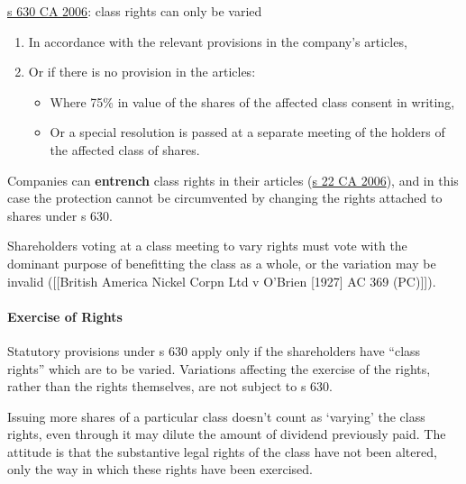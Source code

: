 \documentclass[
]{article}
\providecommand{\tightlist}{%
  \setlength{\itemsep}{0pt}\setlength{\parskip}{0pt}}
\begin{document}
\href{https://www.legislation.gov.uk/ukpga/2006/46/section/630}{s 630 CA
2006}: class rights can only be varied

\begin{enumerate}
\def\labelenumi{\arabic{enumi}.}
\tightlist
\item
  In accordance with the relevant provisions in the company's articles,
\item
  Or if there is no provision in the articles:

  \begin{itemize}
  \tightlist
  \item
    Where 75\% in value of the shares of the affected class consent in
    writing,
  \item
    Or a special resolution is passed at a separate meeting of the
    holders of the affected class of shares.
  \end{itemize}
\end{enumerate}

Companies can \textbf{entrench} class rights in their articles
(\href{https://www.legislation.gov.uk/ukpga/2006/46/section/22}{s 22 CA
2006}), and in this case the protection cannot be circumvented by
changing the rights attached to shares under s 630.

Shareholders voting at a class meeting to vary rights must vote with the
dominant purpose of benefitting the class as a whole, or the variation
may be invalid ({[}{[}British America Nickel Corpn Ltd v O'Brien
{[}1927{]} AC 369 (PC){]}{]}).

\hypertarget{exercise-of-rights}{%
\paragraph{Exercise of Rights}\label{exercise-of-rights}}

Statutory provisions under s 630 apply only if the shareholders have
``class rights'' which are to be varied. Variations affecting the
exercise of the rights, rather than the rights themselves, are not
subject to s 630.

Issuing more shares of a particular class doesn't count as `varying' the
class rights, even through it may dilute the amount of dividend
previously paid. The attitude is that the substantive legal rights of
the class have not been altered, only the way in which these rights have
been exercised.
\end{document}
